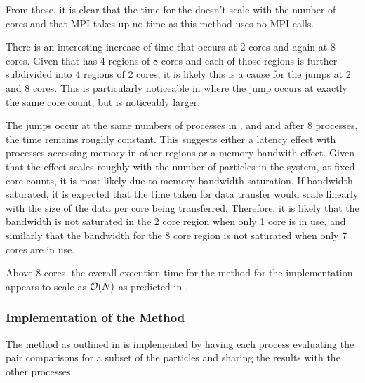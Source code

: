 %
From these, it is clear that
the time for the \individualoperation{} doesn't scale with the number
of cores and that MPI takes up no time as this method uses no MPI calls.

There is an interesting increase of time that occurs at 2 cores and again
at 8 cores.
%
Given that \hector{} has 4 \numa{} regions of 8 cores and each of those
regions is further subdivided into 4 \numa{} regions of 2 cores,
it is likely this is a cause for the jumps at 2 and 8 cores.
%
This is particularly noticeable in
where the jump occurs at exactly the same core count, but is noticeably larger.

The jumps occur at the same numbers of processes in
,
 and
and after 8 processes, the time remains roughly constant.
%
This suggests either a latency effect with processes accessing memory
in other \numa{} regions or a memory bandwith effect.
%
Given that the effect scales roughly with the number of particles
in the system, at fixed core counts, it is most likely due to
memory bandwidth saturation.
%
If bandwidth saturated, it is expected that the time taken for
data transfer would
scale linearly with the size of the data per core being transferred.
%
Therefore, it is likely that the bandwidth is not saturated in
the 2 core \numa{} region
when only 1 core is in use, and
similarly that the bandwidth for
the 8 core \numa{} region is not saturated
when only 7 cores are in use.

Above 8 cores, the overall execution time for
the \individualoperation{} method for the \replicateddata{} implementation
appears to scale as $\mathcal{O}{\left({ N }\right)}$
as predicted in .


%
%

\subsubsection{Implementation of the \pairoperation{} Method}

The \pairoperation{} method as outlined in
is implemented by having each process evaluating the pair
comparisons for a subset of the particles and sharing the
results with the other processes.

